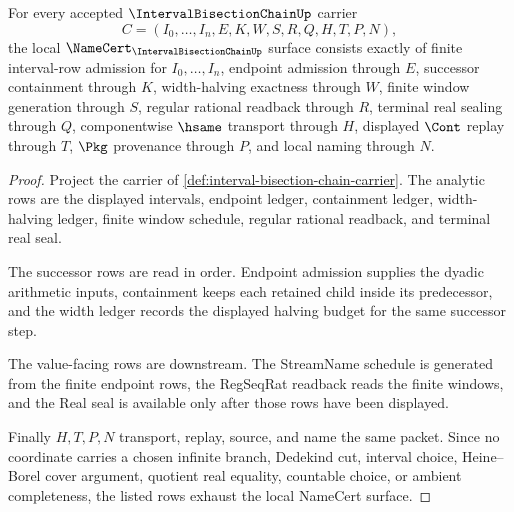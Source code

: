 \begin{theorem}
\label{thm:interval-bisection-chain-namecert-obligations}
For every accepted $\IntervalBisectionChainUp$ carrier
$$
C=(I_0,\ldots,I_n,E,K,W,S,R,Q,H,T,P,N),
$$
the local $\NameCert_{\IntervalBisectionChainUp}$ surface consists exactly of finite interval-row admission for $I_0,\ldots,I_n$, endpoint admission through $E$, successor containment through $K$, width-halving exactness through $W$, finite window generation through $S$, regular rational readback through $R$, terminal real sealing through $Q$, componentwise $\hsame$ transport through $H$, displayed $\Cont$ replay through $T$, $\Pkg$ provenance through $P$, and local naming through $N$.
\end{theorem}
\begin{proof}
Project the carrier of \autoref{def:interval-bisection-chain-carrier}. The analytic rows are the displayed intervals, endpoint ledger, containment ledger, width-halving ledger, finite window schedule, regular rational readback, and terminal real seal.

The successor rows are read in order. Endpoint admission supplies the dyadic arithmetic inputs, containment keeps each retained child inside its predecessor, and the width ledger records the displayed halving budget for the same successor step.

The value-facing rows are downstream. The StreamName schedule is generated from the finite endpoint rows, the RegSeqRat readback reads the finite windows, and the Real seal is available only after those rows have been displayed.

Finally $H,T,P,N$ transport, replay, source, and name the same packet. Since no coordinate carries a chosen infinite branch, Dedekind cut, interval choice, Heine--Borel cover argument, quotient real equality, countable choice, or ambient completeness, the listed rows exhaust the local NameCert surface.
\end{proof}


